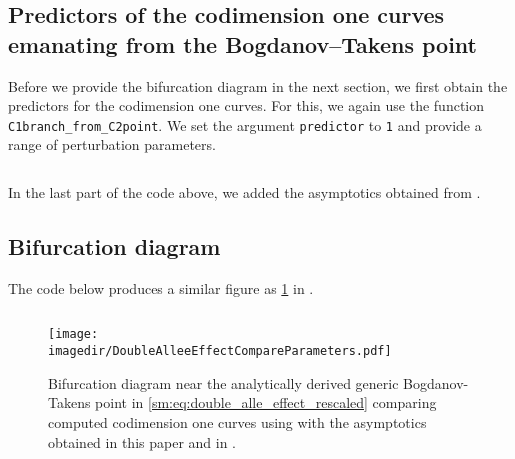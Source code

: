 \subsection{Predictors of the codimension one curves emanating from the Bogdanov--Takens point}
Before we provide the bifurcation diagram in the next section, we first obtain
the predictors for the codimension one curves. For this, we again use the
function \texttt{C1branch_from_C2point}. We set the argument
\texttt{predictor} to \texttt{1} and provide a range of
perturbation parameters.
\inputminted[firstline=118, lastline=137]{MATLAB}{\pathToDDEBifToolDemos/predator_prey/predator_prey.m}
In the last part of the code above, we added the asymptotics obtained from \cite{Jiao2021}.

\subsection{Bifurcation diagram}
The code below produces a similar figure as \cref{sm:fig:DoubleAlleeEffectCompareParameters} in \MATLAB.
\inputminted[firstline=139, lastline=164]{MATLAB}{\pathToDDEBifToolDemos/predator_prey/predator_prey.m}
%
\begin{figure}[ht]
    \centering
    \texttt{[image: \\imagedir/DoubleAlleeEffectCompareParameters.pdf]}
    \caption{Bifurcation diagram near the analytically derived generic Bogdanov-Takens point in
        \cref{sm:eq:double_alle_effect_rescaled} comparing computed codimension one
        curves using \DDEBIFTOOL with the asymptotics obtained in this paper and in \cite{Jiao2021}.}
    \label{sm:fig:DoubleAlleeEffectCompareParameters}
\end{figure}


